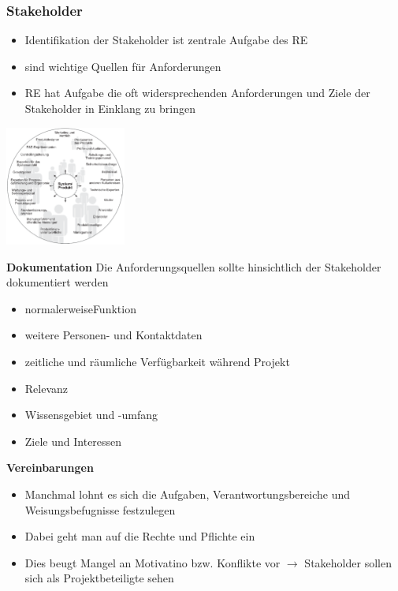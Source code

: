 \documentclass{report}
\newenvironment{Figure}
	{\par\medskip\noindent\minipage{\linewidth}}
	{\endminipage\par\medskip}
\theoremstyle{definition}
\theoremstyle{example}
\begin{document}
\subsubsection{Stakeholder}
\begin{itemize}
   \item Identifikation der Stakeholder ist zentrale Aufgabe des RE
   \item sind wichtige Quellen für Anforderungen
   \item RE hat Aufgabe die oft widersprechenden Anforderungen und Ziele der Stakeholder in Einklang zu bringen
\end{itemize}
\begin{Figure}
   \centering
    \includegraphics[width=150px]{img/Stakeholder.png}
        \label{fig:Ansicht von versch. Stakeholder}
\end{Figure}

\textbf{Dokumentation}
Die Anforderungsquellen sollte hinsichtlich der Stakeholder dokumentiert werden
\begin{itemize}
   \item normalerweiseFunktion
   \item weitere Personen- und Kontaktdaten
   \item zeitliche und räumliche Verfügbarkeit während Projekt
   \item Relevanz
   \item Wissensgebiet und -umfang
   \item Ziele und Interessen
\end{itemize}

\textbf{Vereinbarungen}
\begin{itemize}
   \item Manchmal lohnt es sich die Aufgaben, Verantwortungsbereiche und Weisungsbefugnisse festzulegen
   \item Dabei geht man auf die Rechte und Pflichte ein 
   \item Dies beugt Mangel an Motivatino bzw. Konflikte vor $\rightarrow$ Stakeholder sollen sich als Projektbeteiligte sehen
\end{itemize}
\end{document}
